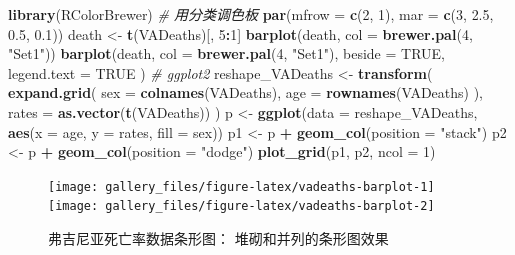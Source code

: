 \documentclass[
  b5paper,
  UTF8,twoside]{book}
\newenvironment{Shaded}{\begin{snugshade}}{\end{snugshade}}
\newcommand{\AttributeTok}[1]{\textcolor[rgb]{0.13,0.29,0.53}{#1}}
\newcommand{\CommentTok}[1]{\textcolor[rgb]{0.56,0.35,0.01}{\textit{#1}}}
\newcommand{\ConstantTok}[1]{\textcolor[rgb]{0.56,0.35,0.01}{#1}}
\newcommand{\DecValTok}[1]{\textcolor[rgb]{0.00,0.00,0.81}{#1}}
\newcommand{\FloatTok}[1]{\textcolor[rgb]{0.00,0.00,0.81}{#1}}
\newcommand{\FunctionTok}[1]{\textcolor[rgb]{0.13,0.29,0.53}{\textbf{#1}}}
\newcommand{\NormalTok}[1]{#1}
\newcommand{\OtherTok}[1]{\textcolor[rgb]{0.56,0.35,0.01}{#1}}
\newcommand{\SpecialCharTok}[1]{\textcolor[rgb]{0.81,0.36,0.00}{\textbf{#1}}}
\newcommand{\StringTok}[1]{\textcolor[rgb]{0.31,0.60,0.02}{#1}}
\begin{document}
\begin{Shaded}
\begin{Highlighting}[]
\FunctionTok{library}\NormalTok{(RColorBrewer) }\CommentTok{\# 用分类调色板}
\FunctionTok{par}\NormalTok{(}\AttributeTok{mfrow =} \FunctionTok{c}\NormalTok{(}\DecValTok{2}\NormalTok{, }\DecValTok{1}\NormalTok{), }\AttributeTok{mar =} \FunctionTok{c}\NormalTok{(}\DecValTok{3}\NormalTok{, }\FloatTok{2.5}\NormalTok{, }\FloatTok{0.5}\NormalTok{, }\FloatTok{0.1}\NormalTok{))}
\NormalTok{death }\OtherTok{\textless{}{-}} \FunctionTok{t}\NormalTok{(VADeaths)[, }\DecValTok{5}\SpecialCharTok{:}\DecValTok{1}\NormalTok{]}
\FunctionTok{barplot}\NormalTok{(death, }\AttributeTok{col =} \FunctionTok{brewer.pal}\NormalTok{(}\DecValTok{4}\NormalTok{, }\StringTok{"Set1"}\NormalTok{))}
\FunctionTok{barplot}\NormalTok{(death,}
  \AttributeTok{col =} \FunctionTok{brewer.pal}\NormalTok{(}\DecValTok{4}\NormalTok{, }\StringTok{"Set1"}\NormalTok{), }\AttributeTok{beside =} \ConstantTok{TRUE}\NormalTok{,}
  \AttributeTok{legend.text =} \ConstantTok{TRUE}
\NormalTok{)}
\CommentTok{\# ggplot2}
\NormalTok{reshape\_VADeaths }\OtherTok{\textless{}{-}} \FunctionTok{transform}\NormalTok{(}
  \FunctionTok{expand.grid}\NormalTok{(}
    \AttributeTok{sex =} \FunctionTok{colnames}\NormalTok{(VADeaths),}
    \AttributeTok{age =} \FunctionTok{rownames}\NormalTok{(VADeaths)}
\NormalTok{  ),}
  \AttributeTok{rates =} \FunctionTok{as.vector}\NormalTok{(}\FunctionTok{t}\NormalTok{(VADeaths))}
\NormalTok{)}
\NormalTok{p }\OtherTok{\textless{}{-}} \FunctionTok{ggplot}\NormalTok{(}\AttributeTok{data =}\NormalTok{ reshape\_VADeaths, }\FunctionTok{aes}\NormalTok{(}\AttributeTok{x =}\NormalTok{ age, }\AttributeTok{y =}\NormalTok{ rates, }\AttributeTok{fill =}\NormalTok{ sex))}
\NormalTok{p1 }\OtherTok{\textless{}{-}}\NormalTok{ p }\SpecialCharTok{+} \FunctionTok{geom\_col}\NormalTok{(}\AttributeTok{position =} \StringTok{"stack"}\NormalTok{)}
\NormalTok{p2 }\OtherTok{\textless{}{-}}\NormalTok{ p }\SpecialCharTok{+} \FunctionTok{geom\_col}\NormalTok{(}\AttributeTok{position =} \StringTok{"dodge"}\NormalTok{)}
\FunctionTok{plot\_grid}\NormalTok{(p1, p2, }\AttributeTok{ncol =} \DecValTok{1}\NormalTok{)}
\end{Highlighting}
\end{Shaded}

\begin{figure}

{\centering \texttt{[image: gallery\_files/figure-latex/vadeaths-barplot-1]} \texttt{[image: gallery\_files/figure-latex/vadeaths-barplot-2]} 

}

\caption[弗吉尼亚死亡率数据条形图]{弗吉尼亚死亡率数据条形图： 堆砌和并列的条形图效果}\label{fig:vadeaths-barplot}
\end{figure}
\end{document}
